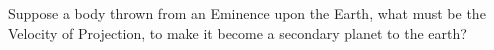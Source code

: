 Suppose a body thrown from an Eminence upon the Earth,
what must be the Velocity of Projection, to make it
become a secondary planet to the earth?
